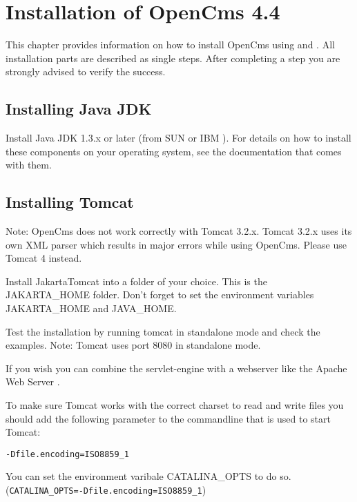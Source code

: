 \chapter{Installation of OpenCms 4.4}

This chapter provides information on how to install OpenCms using
 and
. All installation parts are
described as single steps. After completing a step you are
strongly advised to verify the success.

\section{Installing Java JDK}
Install Java JDK 1.3.x or later (from SUN
or IBM
).
For details on how to install these components on your operating
system, see the documentation that comes with them.

\section{Installing Tomcat}
Note: OpenCms does not work correctly with Tomcat 3.2.x. Tomcat
3.2.x uses its own XML parser which results in major errors while
using OpenCms. Please use Tomcat 4 instead.

Install JakartaTomcat
into a folder of your choice. This is the JAKARTA\_HOME folder.
Don't forget to set the environment variables JAKARTA\_HOME and
JAVA\_HOME.

Test the installation by running tomcat in standalone mode and
check the examples. Note: Tomcat uses port 8080 in standalone
mode.

If you wish you can combine the servlet-engine with a webserver
like the Apache Web Server
.

To make sure Tomcat works with the correct charset to read and
write files you should add the following parameter to the
commandline that is used to start Tomcat:

\texttt{-Dfile.encoding=ISO8859\_1}

You can set the environment varibale CATALINA\_OPTS to do so.
(\texttt{CATALINA\_OPTS=-Dfile.encoding=ISO8859\_1})

